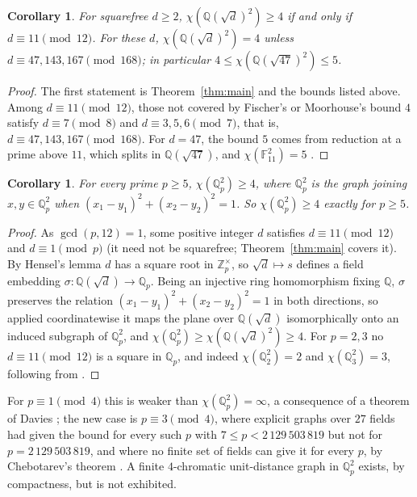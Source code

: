 \documentclass[11pt,a4paper]{amsart}
\newtheorem{corollary}[theorem]{Corollary}
\theoremstyle{remark}
\newcommand{\Q}{\mathbb{Q}}
\newcommand{\Z}{\mathbb{Z}}
\newcommand{\F}{\mathbb{F}}
\begin{document}
\begin{corollary}\label{cor:classification}
For squarefree $d\ge2$, $\chi(\Q(\sqrt d)^2)\ge4$ if and only if $d\equiv11\pmod{12}$. For these $d$,
$\chi(\Q(\sqrt d)^2)=4$ unless $d\equiv47,143,167\pmod{168}$; in particular $4\le\chi(\Q(\sqrt{47})^2)\le5$.
\end{corollary}

\begin{proof}
The first statement is Theorem~\ref{thm:main} and the bounds listed above. Among $d\equiv11\pmod{12}$, those not
covered by Fischer's or Moorhouse's bound $4$ satisfy $d\equiv7\pmod8$ and $d\equiv3,5,6\pmod7$, that is,
$d\equiv47,143,167\pmod{168}$. For $d=47$, the bound $5$ comes from reduction at a prime above $11$, which splits
in $\Q(\sqrt{47})$, and $\chi(\F_{11}^2)=5$ \cite[Lemma~8.2 and Table~6.1]{Moorhouse}.
\end{proof}

\begin{corollary}\label{cor:padic}
For every prime $p\ge5$, $\chi(\Q_p^2)\ge4$, where $\Q_p^2$ is the graph joining $x,y\in\Q_p^2$ when
$(x_1-y_1)^2+(x_2-y_2)^2=1$. So $\chi(\Q_p^2)\ge4$ exactly for $p\ge5$.
\end{corollary}

\begin{proof}
As $\gcd(p,12)=1$, some positive integer $d$ satisfies $d\equiv11\pmod{12}$ and $d\equiv1\pmod p$ (it need not be
squarefree; Theorem~\ref{thm:main} covers it). By Hensel's lemma $d$ has a square root in $\Z_p^\times$, so
$\sqrt d\mapsto s$ defines a field embedding $\sigma\colon\Q(\sqrt d)\to\Q_p$. Being an injective ring homomorphism
fixing $\Q$, $\sigma$ preserves the relation $(x_1-y_1)^2+(x_2-y_2)^2=1$ in both directions, so applied coordinatewise
it maps the plane over $\Q(\sqrt d)$ isomorphically onto an induced subgraph of $\Q_p^2$, and
$\chi(\Q_p^2)\ge\chi(\Q(\sqrt d)^2)\ge4$. For $p=2,3$ no $d\equiv11\pmod{12}$ is a square in $\Q_p$, and indeed
$\chi(\Q_2^2)=2$ and $\chi(\Q_3^2)=3$, following from \cite{Madore}.
\end{proof}

For $p\equiv1\pmod4$ this is weaker than $\chi(\Q_p^2)=\infty$, a consequence of a theorem of Davies \cite{Davies}; the
new case is $p\equiv3\pmod4$, where explicit graphs over $27$ fields had given the bound for every such $p$ with
$7\le p<2\,129\,503\,819$ but not for $p=2\,129\,503\,819$, and
where no finite set of fields can give it for every $p$, by Chebotarev's theorem \cite{PA}. A finite $4$-chromatic
unit-distance graph in $\Q_p^2$ exists, by compactness, but is not exhibited.
\end{document}
